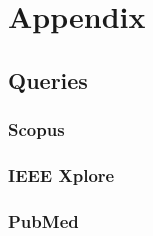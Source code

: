 \documentclass[conference]{IEEEtran}
\begin{document}
\section*{Appendix}

\subsection{Queries}

\subsubsection{Scopus}


\subsubsection{IEEE Xplore}


\subsubsection{PubMed}





\end{document}
